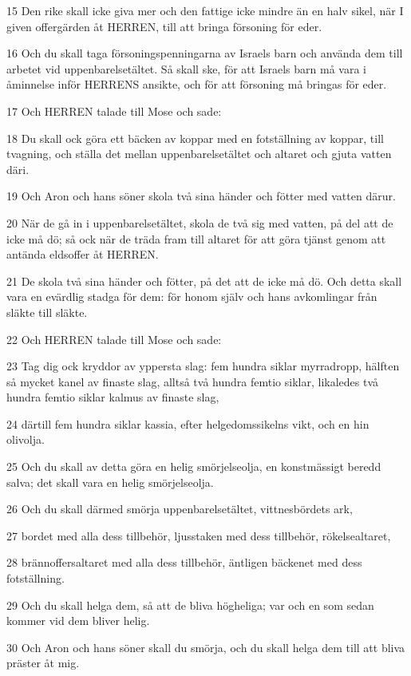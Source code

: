 \par 15 Den rike skall icke giva mer och den fattige icke mindre än en halv sikel, när I given offergärden åt HERREN, till att bringa försoning för eder.
\par 16 Och du skall taga försoningspenningarna av Israels barn och använda dem till arbetet vid uppenbarelsetältet. Så skall ske, för att Israels barn må vara i åminnelse inför HERRENS ansikte, och för att försoning må bringas för eder.
\par 17 Och HERREN talade till Mose och sade:
\par 18 Du skall ock göra ett bäcken av koppar med en fotställning av koppar, till tvagning, och ställa det mellan uppenbarelsetältet och altaret och gjuta vatten däri.
\par 19 Och Aron och hans söner skola två sina händer och fötter med vatten därur.
\par 20 När de gå in i uppenbarelsetältet, skola de två sig med vatten, på del att de icke må dö; så ock när de träda fram till altaret för att göra tjänst genom att antända eldsoffer åt HERREN.
\par 21 De skola två sina händer och fötter, på det att de icke må dö. Och detta skall vara en evärdlig stadga för dem: för honom själv och hans avkomlingar från släkte till släkte.
\par 22 Och HERREN talade till Mose och sade:
\par 23 Tag dig ock kryddor av yppersta slag: fem hundra siklar myrradropp, hälften så mycket kanel av finaste slag, alltså två hundra femtio siklar, likaledes två hundra femtio siklar kalmus av finaste slag,
\par 24 därtill fem hundra siklar kassia, efter helgedomssikelns vikt, och en hin olivolja.
\par 25 Och du skall av detta göra en helig smörjelseolja, en konstmässigt beredd salva; det skall vara en helig smörjelseolja.
\par 26 Och du skall därmed smörja uppenbarelsetältet, vittnesbördets ark,
\par 27 bordet med alla dess tillbehör, ljusstaken med dess tillbehör, rökelsealtaret,
\par 28 brännoffersaltaret med alla dess tillbehör, äntligen bäckenet med dess fotställning.
\par 29 Och du skall helga dem, så att de bliva högheliga; var och en som sedan kommer vid dem bliver helig.
\par 30 Och Aron och hans söner skall du smörja, och du skall helga dem till att bliva präster åt mig.
